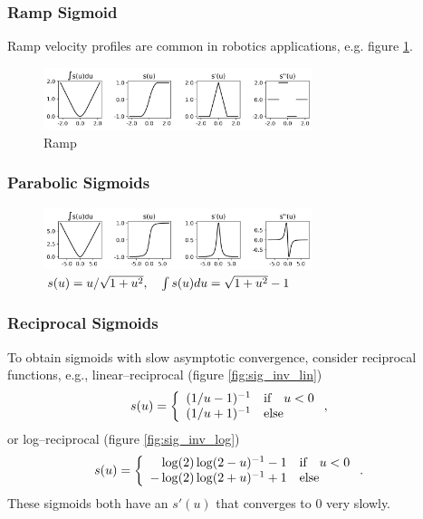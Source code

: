 \documentclass{article}
\begin{document}
\clearpage

\subsubsection{Ramp Sigmoid}
    Ramp velocity profiles are common in robotics applications,
    e.g. figure \ref{fig:sig_ramp}.
    \begin{figure}[h!]
        \centering
        \includegraphics[width=0.7\textwidth]{./figs/nn/sig/trap.png}
        \caption{Ramp}
        \label{fig:sig_ramp}
    \end{figure} 

\subsubsection{Parabolic Sigmoids}
    \begin{figure}[h!]
        \centering
        \includegraphics[width=0.7\textwidth]{./figs/nn/sig/parabola.png}
        \caption{$s(u)=u/\sqrt{1+u^2},\quad \int s(u)du = \sqrt{1+u^2}-1$}
        \label{fig:sig_parabola}
    \end{figure}

\subsubsection{Reciprocal Sigmoids}

    To obtain sigmoids with slow asymptotic convergence,
    consider reciprocal functions, e.g., linear--reciprocal (figure \ref{fig:sig_inv_lin})
    \begin{align*}
        s(u)&=
        \left\{
        \begin{array}{lllllllllllllllllll}
                (1/u-1)^{-1} & \text{if}\quad u<0\\
        (1/u+1)^{-1} & \text{else}
        \end{array}    
        \right.,
    \end{align*}
    or log--reciprocal (figure \ref{fig:sig_inv_log})
    \begin{align*}
        s(u)&=
        \left\{
        \arr{
                \minus\log(2)
                \log(2-u)^{-1}-1 & \text{if}\quad u<0\\
        -\log(2)\log(2+u)^{-1}+1 & \text{else}
        }    
        \right..
    \end{align*}
    These sigmoids both have an $s'(u)$ that converges to 0 very slowly.
\end{document}
